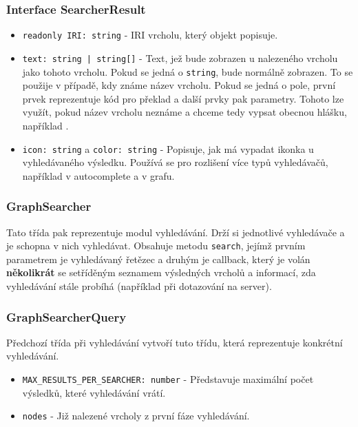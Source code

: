 \subsubsection{Interface SearcherResult}
\begin{itemize}
  \item \texttt{readonly IRI: string} - IRI vrcholu, který objekt popisuje.
  \item \texttt{text: string | string[]} - Text, jež bude zobrazen u nalezeného vrcholu jako  tohoto vrcholu. Pokud se jedná o \texttt{string}, bude normálně zobrazen. To se použije v případě, kdy známe název vrcholu. Pokud se jedná o pole, první prvek reprezentuje kód pro překlad a další prvky pak parametry. Tohoto lze využít, pokud název vrcholu neznáme a chceme tedy vypsat obecnou hlášku, například .
  \item \texttt{icon: string} a \texttt{color: string} - Popisuje, jak má vypadat ikonka u vyhledávaného výsledku. Používá se pro rozlišení více typů vyhledávačů, například v autocomplete a v grafu.
\end{itemize}

\subsubsection{GraphSearcher}
Tato třída pak reprezentuje modul vyhledávání. Drží si jednotlivé vyhledávače a je schopna v nich vyhledávat. Obsahuje metodu \texttt{search}, jejímž prvním parametrem je vyhledávaný řetězec a druhým je callback, který je volán \textbf{několikrát} se setříděným seznamem výsledných vrcholů a informací, zda vyhledávání stále probíhá (například při dotazování na server).

\subsubsection{GraphSearcherQuery}
Předchozí třída při vyhledávání vytvoří tuto třídu, která reprezentuje konkrétní vyhledávání.
\begin{itemize}
  \item \texttt{MAX_RESULTS_PER_SEARCHER: number} - Představuje maximální počet výsledků, které vyhledávání vrátí.
  \item \texttt{nodes} - Již nalezené vrcholy z první fáze vyhledávání.
\end{itemize}

